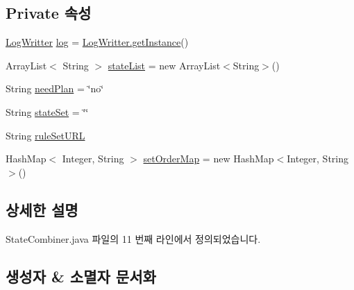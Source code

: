 \subsection*{Private 속성}
\begin{DoxyCompactItemize}
\item 
\mbox{\hyperlink{classcom_1_1github_1_1aites_1_1framework_1_1log_1_1_log_writter}{Log\+Writter}} \mbox{\hyperlink{classcom_1_1github_1_1aites_1_1framework_1_1analyzer_1_1_state_combiner_a3685308aa344cc8e08f43775ddba45f3}{log}} = \mbox{\hyperlink{classcom_1_1github_1_1aites_1_1framework_1_1log_1_1_log_writter_a2f315148575291db6f24553791068c42}{Log\+Writter.\+get\+Instance}}()
\item 
Array\+List$<$ String $>$ \mbox{\hyperlink{classcom_1_1github_1_1aites_1_1framework_1_1analyzer_1_1_state_combiner_a1997e445fc92d5f97741d28ff6010299}{state\+List}} = new Array\+List$<$String$>$()
\item 
String \mbox{\hyperlink{classcom_1_1github_1_1aites_1_1framework_1_1analyzer_1_1_state_combiner_af0496a81af3ca980d3fd1bef9c14dc65}{need\+Plan}} = \char`\"{}no\char`\"{}
\item 
String \mbox{\hyperlink{classcom_1_1github_1_1aites_1_1framework_1_1analyzer_1_1_state_combiner_a22e4dfec53b75aec655f02328f96f4c0}{state\+Set}} = \char`\"{}\char`\"{}
\item 
String \mbox{\hyperlink{classcom_1_1github_1_1aites_1_1framework_1_1analyzer_1_1_state_combiner_a28a5b0f5141f7dc072500524894d7041}{rule\+Set\+U\+RL}}
\item 
Hash\+Map$<$ Integer, String $>$ \mbox{\hyperlink{classcom_1_1github_1_1aites_1_1framework_1_1analyzer_1_1_state_combiner_abcc50de313d376043ae0b3680e2df001}{set\+Order\+Map}} = new Hash\+Map$<$Integer, String$>$()
\end{DoxyCompactItemize}


\subsection{상세한 설명}


State\+Combiner.\+java 파일의 11 번째 라인에서 정의되었습니다.



\subsection{생성자 \& 소멸자 문서화}
\mbox{\label{classcom_1_1github_1_1aites_1_1framework_1_1analyzer_1_1_state_combiner_abd4a5d9e8f9be68067e183aa30d54a6c}} 

